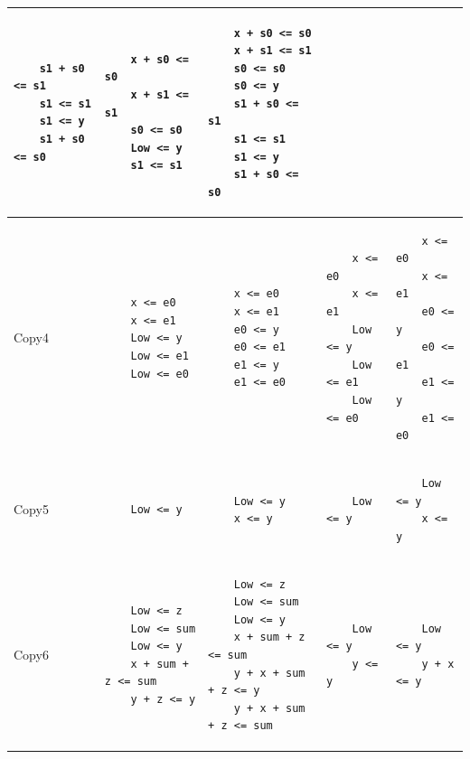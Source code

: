\begin{table}
\begin{tabular}{|l|l|l|l|l|}
\begin{lstlisting}
	s1 + s0 <= s1
	s1 <= s1
	s1 <= y
	s1 + s0 <= s0
	\end{lstlisting}&
	\begin{lstlisting}
	x + s0 <= s0
	x + s1 <= s1
	s0 <= s0
	Low <= y
	s1 <= s1
	\end{lstlisting}&
	\begin{lstlisting}
	x + s0 <= s0
	x + s1 <= s1
	s0 <= s0
	s0 <= y
	s1 + s0 <= s1
	s1 <= s1
	s1 <= y
	s1 + s0 <= s0
	\end{lstlisting}
	\\
	\hline
	Copy4&
	\begin{lstlisting}
	x <= e0
	x <= e1
	Low <= y
	Low <= e1
	Low <= e0
	\end{lstlisting}&
	\begin{lstlisting}
	x <= e0
	x <= e1
	e0 <= y
	e0 <= e1
	e1 <= y
	e1 <= e0
	\end{lstlisting}&
	\begin{lstlisting}
	x <= e0
	x <= e1
	Low <= y
	Low <= e1
	Low <= e0
	\end{lstlisting}&
	\begin{lstlisting}
	x <= e0
	x <= e1
	e0 <= y
	e0 <= e1
	e1 <= y
	e1 <= e0
	\end{lstlisting}
	\\
	\hline
	Copy5&
	\begin{lstlisting}
	Low <= y
	\end{lstlisting} &
	\begin{lstlisting}
	Low <= y
	x <= y
	\end{lstlisting}&
	\begin{lstlisting}
	Low <= y 
	\end{lstlisting}&
	\begin{lstlisting}
	Low <= y
	x <= y
	\end{lstlisting}\\
	\hline
	Copy6&
	\begin{lstlisting}
	Low <= z
	Low <= sum
	Low <= y
	x + sum + z <= sum
	y + z <= y
	\end{lstlisting}&
	\begin{lstlisting}
	Low <= z
	Low <= sum
	Low <= y
	x + sum + z <= sum
	y + x + sum + z <= y
	y + x + sum + z <= sum
	\end{lstlisting} &
	\begin{lstlisting}
	Low <= y
	y <= y  
	\end{lstlisting}&
	\begin{lstlisting}
	Low <= y
	y + x <= y
	\end{lstlisting}\\

\end{tabular}
\end{table}

